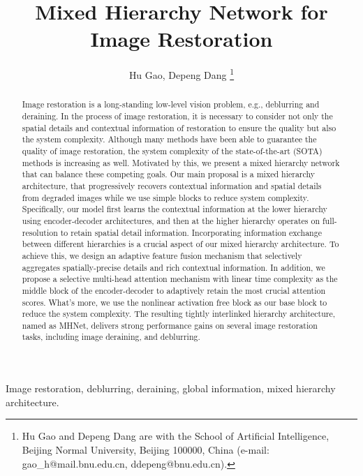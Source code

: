 \documentclass[lettersize,journal]{IEEEtran}
\begin{document}
\title{Mixed Hierarchy Network for Image Restoration}

\author{Hu Gao, Depeng Dang
\thanks{Hu Gao and Depeng Dang are with the School of
Artificial Intelligence, Beijing Normal University,
Beijing 100000, China (e-mail: gao\_h@mail.bnu.edu.cn, ddepeng@bnu.edu.cn).}}




\IEEEpubid{}


\maketitle

\begin{abstract}
Image restoration is a long-standing low-level vision problem, e.g., deblurring and deraining. In the process of image restoration, it is necessary to consider not only the spatial details and contextual information of restoration to ensure the quality but also the system complexity. Although many methods have been able to guarantee the quality of image restoration, the system complexity of the state-of-the-art (SOTA) methods is increasing as well. Motivated by this, we present a mixed hierarchy network that can balance these competing goals. Our main proposal is a mixed hierarchy architecture, that progressively recovers contextual information and spatial details from degraded images while we use simple blocks to reduce system complexity. 
Specifically, our model first learns the contextual information at the lower hierarchy using encoder-decoder architectures, and then at the higher hierarchy operates on full-resolution to retain spatial detail information. 
Incorporating information exchange between different hierarchies is a crucial aspect of our mixed hierarchy architecture. To achieve this, we design an adaptive feature fusion mechanism that selectively aggregates spatially-precise details and rich contextual information.
In addition, we propose a  selective multi-head attention mechanism  with linear time complexity as the middle block of the encoder-decoder to adaptively retain the most crucial attention scores. 
What's more, we use the nonlinear activation free block as our base block to reduce the system complexity.
The resulting tightly interlinked hierarchy architecture, named as MHNet, delivers strong performance gains on several image restoration tasks, including image deraining, and deblurring. 
\end{abstract}

\begin{IEEEkeywords}
Image restoration, deblurring, deraining,  global information, mixed hierarchy architecture.
\end{IEEEkeywords}
\end{document}
